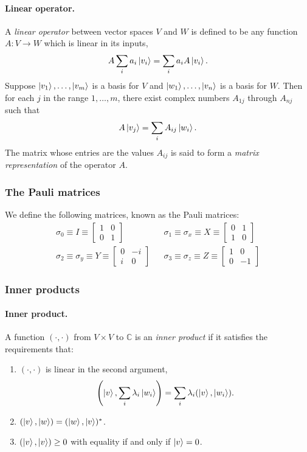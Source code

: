 \documentclass{article}
\numberwithin{theorem}{section}
\numberwithin{corollary}{section}
\begin{document}
\paragraph{Linear operator.} A \emph{linear operator} between vector spaces $V$
and $W$ is defined to be any function $A: V \to W$ which is linear in its
inputs, \[
  A\sum_i a_i\ket{v_i} = \sum_i a_iA\ket{v_i}.
\] Suppose $\ket{v_1}, \ldots, \ket{v_m}$ is a basis for $V$ and $\ket{w_1},
\ldots, \ket{v_n}$ is a basis for $W$. Then for each $j$ in the range $1,
\ldots, m$, there exist complex numbers $A_{1j}$ through $A_{nj}$ such that \[
  A\ket{v_j} = \sum_i A_{ij}\ket{w_i}.
\] The matrix whose entries are the values $A_{ij}$ is said to form a
\emph{matrix representation} of the operator $A$.

\subsubsection{The Pauli matrices}

We define the following matrices, known as the Pauli matrices:
\begin{align*}
  \sigma_0 \equiv I \equiv
  \begin{bmatrix}
    1 & 0 \\
    0 & 1
  \end{bmatrix}&
  &\sigma_1 \equiv \sigma_x \equiv X \equiv
  \begin{bmatrix}
    0 & 1 \\
    1 & 0
  \end{bmatrix} \\
  \sigma_2 \equiv \sigma_y \equiv Y \equiv
  \begin{bmatrix}
    0 & -i \\
    i & 0
  \end{bmatrix}&
  &\sigma_3 \equiv \sigma_z \equiv Z \equiv
  \begin{bmatrix}
    1 & 0 \\
    0 & -1
  \end{bmatrix}
\end{align*}

\subsubsection{Inner products}

\paragraph{Inner product.} A function $(\cdot, \cdot)$ from $V \times V$ to
$\mathbb{C}$ is an \emph{inner product} if it satisfies the requirements that:
\begin{enumerate}[(1)]
  \item $(\cdot, \cdot)$ is linear in the second argument, \[
      \left(\ket{v}, \sum_i \lambda_i\ket{w_i}\right)
      = \sum_i \lambda_i(\ket{v}, \ket{w_i}).
    \]
  \item $(\ket{v}, \ket{w}) = (\ket{w}, \ket{v})^*$.
  \item $(\ket{v}, \ket{v}) \geq 0$ with equality if and only if $\ket{v} = 0$.
\end{enumerate}
\end{document}
